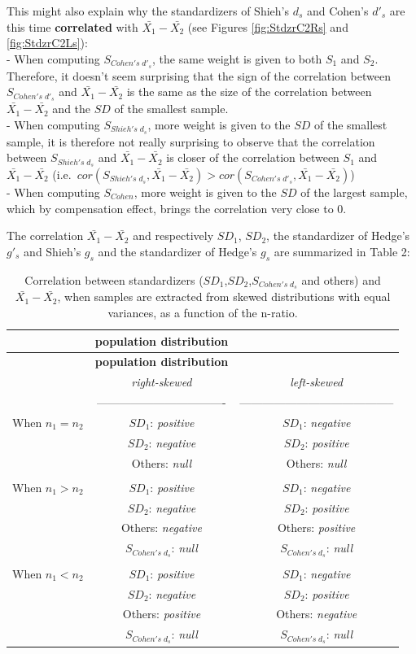 \documentclass[
  man]{apa6}
\begin{document}
This might also explain why the standardizers of Shieh's \(d_s\) and Cohen's \(d'_s\) are this time \textbf{correlated} with \(\bar{X_1}-\bar{X_2}\) (see Figures \ref{fig:StdzrC2Rs} and \ref{fig:StdzrC2Ls}):\\
- When computing \(S_{Cohen's \; d'_s}\), the same weight is given to both \(S_1\) and \(S_2\). Therefore, it doesn't seem surprising that the sign of the correlation between \(S_{Cohen's \; d'_s}\) and \(\bar{X_1}-\bar{X_2}\) is the same as the size of the correlation between \(\bar{X_1}-\bar{X_2}\) and the \(SD\) of the smallest sample.\\
- When computing \(S_{Shieh's \; d_s}\), more weight is given to the \(SD\) of the smallest sample, it is therefore not really surprising to observe that the correlation between \(S_{Shieh's \; d_s}\) and \(\bar{X_1}-\bar{X_2}\) is closer of the correlation between \(S_1\) and \(\bar{X_1}-\bar{X_2}\) (i.e.~\(cor(S_{Shieh's \; d_s},\bar{X_1}-\bar{X_2}) > cor(S_{Cohen's \; d'_s},\bar{X_1}-\bar{X_2})\))\\
- When computing \(S_{Cohen}\), more weight is given to the \(SD\) of the largest sample, which by compensation effect, brings the correlation very close to 0.

The correlation \(\bar{X_1}-\bar{X_2}\) and respectively \(SD_1\), \(SD_2\), the standardizer of Hedge's \(g'_s\) and Shieh's \(g_s\) and the standardizer of Hedge's \(g_s\) are summarized in Table 2:

\begin{longtable}[]{@{}lcc@{}}
\caption{Correlation between standardizers (\(SD_1\),\(SD_2\),\(S_{Cohen's \; d_s}\) and others) and \(\bar{X_1}-\bar{X_2}\), when samples are extracted from skewed distributions with equal variances, as a function of the n-ratio.}\tabularnewline
\toprule
& \textbf{\textbf{population distribution}} &\tabularnewline
\midrule
\endfirsthead
\toprule
& \textbf{\textbf{population distribution}} &\tabularnewline
\midrule
\endhead
& \emph{right-skewed} & \emph{left-skewed}\tabularnewline
& ---------------------------------- & -----------------------------------------\tabularnewline
When \(n_1=n_2\) & \(SD_1\): \emph{positive} & \(SD_1\): \emph{negative}\tabularnewline
& \(SD_2\): \emph{negative} & \(SD_2\): \emph{positive}\tabularnewline
& Others: \emph{null} & Others: \emph{null}\tabularnewline
& &\tabularnewline
When \(n_1>n_2\) & \(SD_1\): \emph{positive} & \(SD_1\): \emph{negative}\tabularnewline
& \(SD_2\): \emph{negative} & \(SD_2\): \emph{positive}\tabularnewline
& Others: \emph{negative} & Others: \emph{positive}\tabularnewline
& \(S_{Cohen's \; d_s}\): \emph{null} & \(S_{Cohen's \; d_s}\): \emph{null}\tabularnewline
& &\tabularnewline
When \(n_1<n_2\) & \(SD_1\): \emph{positive} & \(SD_1\): \emph{negative}\tabularnewline
& \(SD_2\): \emph{negative} & \(SD_2\): \emph{positive}\tabularnewline
& Others: \emph{positive} & Others: \emph{negative}\tabularnewline
& \(S_{Cohen's \; d_s}\): \emph{null} & \(S_{Cohen's \; d_s}\): \emph{null}\tabularnewline
\bottomrule
\end{longtable}
\end{document}
